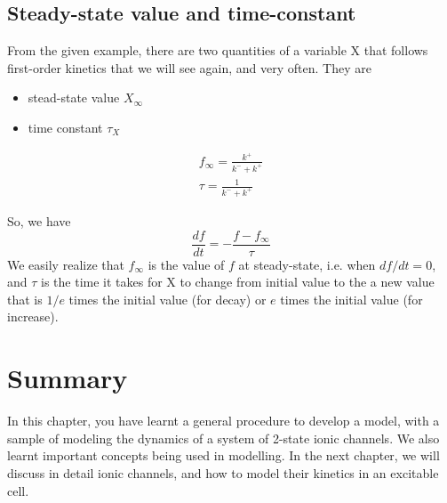 \subsection{Steady-state value and time-constant}

From the given example, there are two quantities of a variable X that follows
first-order kinetics that we will see again, and very often. They are 
\begin{itemize}
  \item stead-state value $X_\infty$
  \item time constant $\tau_X$
\end{itemize}

\begin{equation}
  \label{eq:685}
  \begin{split}
f_\infty=\frac{k^+}{k^-+k^+} \\
\tau=\frac{1}{k^-+k^+}
\end{split}
\end{equation}

So, we have
\begin{equation}
  \label{eq:686}
  \frac{df}{dt} = -\frac{f-f_\infty}{\tau}
\end{equation}
We easily realize that $f_\infty$ is the value of $f$ at steady-state,
i.e. when $df/dt=0$, and $\tau$ is the time it takes for X to change from
initial value to the a new value that is $1/e$ times the initial value (for
decay) or $e$ times the initial value (for increase).
  

\section{Summary}
\label{sec:summary-7}

In this chapter, you have learnt a general procedure to develop a model, with a
sample of modeling the dynamics of a system of 2-state ionic channels. We also
learnt important concepts being used in modelling. In the next chapter, we will
discuss in detail ionic channels, and how to model their kinetics in an
excitable cell.

